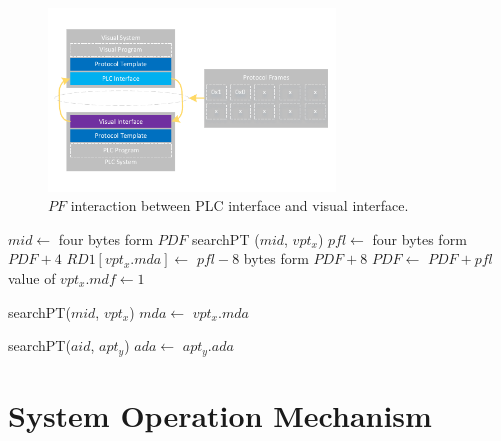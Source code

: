 \documentclass[journal,UTF8]{IEEEtran}
\begin{document}
\begin{figure}
	\centering
	\includegraphics[width=3in]{fig/FlexibleLayer.pdf}
	\caption{ $PF$ interaction between PLC interface and visual interface.}
	\label{fig:FlexibleLayer}
\end{figure}
\begin{algorithm}
	\label{alg4}
	\caption{$VCADeframing$}%
    $mid \leftarrow$ four bytes form $PDF$\;
    searchPT ($mid$, $vpt_x$)\;
    $pfl \leftarrow$ four bytes form $PDF+4$\; 
    $RD1[vpt_x.mda]\leftarrow$ $pfl-8$ bytes form $PDF+8$\;     	
	$PDF\leftarrow$ $PDF+pfl$\;
	value of $vpt_x.mdf\leftarrow 1$\;
\end{algorithm}

\begin{algorithm}
	\label{alg5}
	\caption{$CLDeframing$}%
	searchPT($mid$, $vpt_x$)\;
	$mda\leftarrow$ $vpt_x.mda$\;	
\end{algorithm}

\begin{algorithm}
	\label{alg6}
	\caption{$ALDeframing$}%
	searchPT($aid$, $apt_y$)\;
	$ada\leftarrow$ $apt_y.ada$\;
\end{algorithm}


\section{System Operation Mechanism}
\label{Execution}
\end{document}

